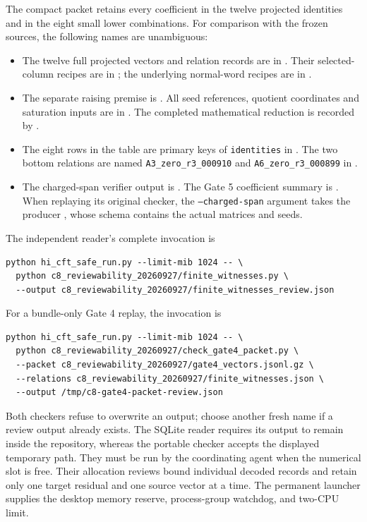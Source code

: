 The compact packet retains every coefficient in the twelve
projected identities and in the eight small lower combinations.
For comparison with the frozen sources, the following names are
unambiguous:
\begin{itemize}
\item The twelve full projected vectors and relation records are in
.
Their selected-column recipes are in
; the
underlying normal-word recipes are in
.
\item The separate raising premise is
.
All seed references, quotient coordinates and saturation inputs
are in
.
The completed mathematical reduction is recorded by
.
\item The eight rows in the table are primary keys of
\texttt{identities} in
.
The two bottom relations are named
\texttt{A3\_zero\_r3\_000910} and
\texttt{A6\_zero\_r3\_000899} in
.
\item The charged-span verifier output is
.
The Gate 5 coefficient summary is
.
When replaying its original checker, the \texttt{--charged-span}
argument takes the producer
,
whose schema contains the actual matrices and seeds.
\end{itemize}

The independent reader's complete invocation is
\begin{verbatim}
python hi_cft_safe_run.py --limit-mib 1024 -- \
  python c8_reviewability_20260927/finite_witnesses.py \
  --output c8_reviewability_20260927/finite_witnesses_review.json
\end{verbatim}
For a bundle-only Gate 4 replay, the invocation is
\begin{verbatim}
python hi_cft_safe_run.py --limit-mib 1024 -- \
  python c8_reviewability_20260927/check_gate4_packet.py \
  --packet c8_reviewability_20260927/gate4_vectors.jsonl.gz \
  --relations c8_reviewability_20260927/finite_witnesses.json \
  --output /tmp/c8-gate4-packet-review.json
\end{verbatim}
Both checkers refuse to overwrite an output; choose another fresh name
if a review output already exists.  The SQLite reader requires its
output to remain inside the repository, whereas the portable checker
accepts the displayed temporary path.  They must be run by the coordinating
agent when the numerical slot is free.  Their allocation reviews bound
individual decoded records and retain only one target residual and
one source vector at a time.  The permanent launcher supplies the
desktop memory reserve, process-group watchdog, and two-CPU limit.

